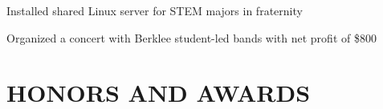 \documentclass[10pt]{article}
\begin{document}
\begin{FlushLeft}
  \begin{itemize}{
    \item Installed shared Linux server for STEM majors in fraternity
    \item Organized a concert with Berklee student-led bands with net profit of \$800
    }
  \end{itemize}

  
  \section{HONORS AND AWARDS}
  \vspace{-0.75em}
  \begin{itemize}{
    \item {}
    }
  \end{itemize}

\end{FlushLeft}
\end{document}
